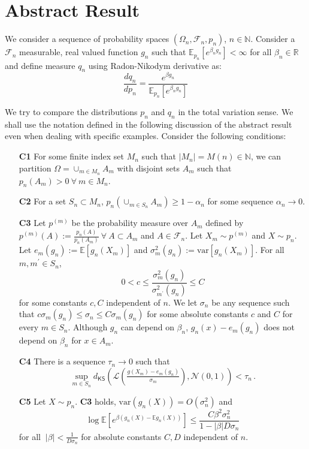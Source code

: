 \documentclass[final,12pt]{colt2018}
\begin{document}
\section{Abstract Result}
\label{sec:abstract_result}
We consider a sequence of probability spaces $(\Omega_n,\mathcal{F}_n,p_n)$, $n \in \mathbb{N}$. Consider a $\mathcal{F}_n$ measurable, real valued function $g_n$ such that $\mathbb{E}_{p_n} [e^{\beta_n g_n}] < \infty$ for all $\beta_n \in \mathbb{R}$ and define measure $q_n$ using Radon-Nikodym derivative as:
  $$\frac{dq_n}{dp_n} = \frac{e^{\beta g_n}}{\mathbb{E}_{p_n}[e^{\beta_n g_n}]}$$
  
We try to compare the distributions $p_n$ and $q_n$ in the total variation sense. We shall use the notation defined in the following discussion of the abstract result even when dealing with specific examples. Consider the following conditions:
\begin{enumerate}
\item[\textbf{C1}]
For some finite index set $M_n$ such that $|M_n| = M(n) \in \mathbb{N}$, we can partition $\Omega = \cup_{m\in M_n}A_m$ with disjoint sets $A_m$ such that $p_n(A_m) > 0\ \forall \ m \in M_n$.
  \label{partition}
 \item[\textbf{C2}]
 For a set $S_n \subset M_n$,  $p_n(\cup_{m\in S_n} A_m) \geq 1 - \alpha_n$ for some sequence $\alpha_n \to 0$.
\label{high_probability}
 \item[\textbf{C3}]
   Let $p^{(m)}$ be the probability measure over $A_m$ defined by $p^{(m)}(A) := \frac{p_n(A)}{p_n(A_m)} \ \forall \ A \subset A_m $ and $A \in \mathcal{F}_n$. 
   Let $X_m \sim p^{(m)}$ and $X \sim p_n$. Let  $e_m(g_n) := \mathbb{E}[g_n(X_m)] $ and $\sigma^2_m(g_n) := \mathrm{var} \left[{g_n(X_m)}\right]$. For all $m, m^{\prime} \in S_n$, 
   $$ 0< c \leq \frac{\sigma_m^2(g_n)}{\sigma_{m^{\prime}}^2(g_n)} \leq C$$ 
   for some constants $c,C$ independent of $n$. We let $\sigma_n$ be any sequence such that $c\sigma_m(g_n) \leq \sigma_n\leq C\sigma_m(g_n)$  for some absolute constants $c$ and $C$ for every $m \in S_n$. Although $g_n$ can depend on $\beta_n$, $g_n(x)-e_m(g_n)$ does not depend on $\beta_n$ for $x \in A_m$.
   \label{partition_regularity}
  \item[\textbf{C4}] There is a sequence $\tau_n \to 0$ such that
  $$\sup_{m \in S_n} d_{\mathsf{KS}}\left(\mathcal{L}\left(\tfrac{g(X_m) - e_m(g_n)}{\sigma_m}\right),\mathcal{N}(0,1)\right) < \tau_n\,.$$  \label{partition_central_limit}
  \item[\textbf{C5}] Let $X \sim p_n$. \textbf{C3} holds, $\mathrm{var}(g_n(X)) = O(\sigma^2_n)$ and 
  $$\log{\mathbb{E}\left[e^{\beta \left(g_n(X)- \mathbb{E}g_n(X)\right)}\right]} \leq \frac{C\beta^2 \sigma_n^2}{1-|\beta| D\sigma_n}$$
  for all $\ |\beta| < \frac{1}{D\sigma_n}$  for absolute constants $C,D$ independent of $n$. 


  \label{partition_concentration}
\end{enumerate}
\end{document}
